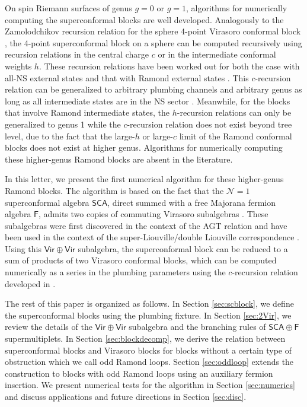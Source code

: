 \documentclass[aps,10pt,twocolumn,superscriptaddress]{revtex4-2}
\begin{document}
On spin Riemann surfaces of genus $g=0$ or $g=1$, algorithms for numerically computing the superconformal blocks are well developed. Analogously to the Zamolodchikov recursion relation for the sphere 4-point Virasoro conformal block \cite{Zamolodchikov:1984eqp,Zamolodchikov:1987avt}, the 4-point superconformal block on a sphere can be computed recursively using recursion relations in the central charge $c$ or in the intermediate conformal weights $h$. These recursion relations have been worked out for both the case with all-NS external states \cite{Hadasz:2006qb,Hadasz:2007nt,Belavin:2007zz} and that with Ramond external states \cite{Hadasz:2008dt,Suchanek:2010kq}. This $c$-recursion relation can be generalized to arbitrary plumbing channels and arbitrary genus as long as all intermediate states are in the NS sector \cite{Cho:2017oxl,Belavin:2018hfm}. Meanwhile, for the blocks that involve Ramond intermediate states, the $h$-recursion relations can only be generalized to genus 1 \cite{Hadasz:2012im} while the $c$-recursion relation does not exist beyond tree level, due to the fact that the large-$h$ or large-$c$ limit of the Ramond conformal blocks does not exist at higher genus. Algorithms for numerically computing these higher-genus Ramond blocks are absent in the literature.

In this letter, we present the first numerical algorithm for these higher-genus Ramond blocks. The algorithm is based on the fact that the $\mathcal{N}=1$ superconformal algebra $\mathsf{SCA}$, direct summed with a free Majorana fermion algebra $\mathsf{F}$, admits two copies of commuting Virasoro subalgebras \cite{Bershtein:2014yia,Bershtein:2016uov}. These subalgebras were first discovered in the context of the AGT relation \cite{Alday:2009aq,Belavin:2011sw} and have been used in the context of the super-Liouville/double Liouville correspondence \cite{Schomerus:2012se,Hadasz:2013dza}. Using this $\mathsf{Vir}\oplus \mathsf{Vir}$ subalgebra, the superconformal block can be reduced to a sum of products of two Virasoro conformal blocks, which can be computed numerically as a series in the plumbing parameters using the $c$-recursion relation developed in \cite{Cho:2017oxl}.

The rest of this paper is organized as follows. In Section \ref{sec:scblock}, we define the superconformal blocks using the plumbing fixture. In Section \ref{sec:2Vir}, we review the details of the $\mathsf{Vir}\oplus \mathsf{Vir}$ subalgebra and the branching rules of $\mathsf{SCA}\oplus \mathsf{F}$ supermultiplets. In Section \ref{sec:blockdecomp}, we derive the relation between superconformal blocks and Virasoro blocks for blocks without a certain type of obstruction which we call odd Ramond loops. Section \ref{sec:oddloop} extends the construction to blocks with odd Ramond loops using an auxiliary fermion insertion. We present numerical tests for the algorithm in Section \ref{sec:numerics} and discuss applications and future directions in Section \ref{sec:disc}.
\end{document}
